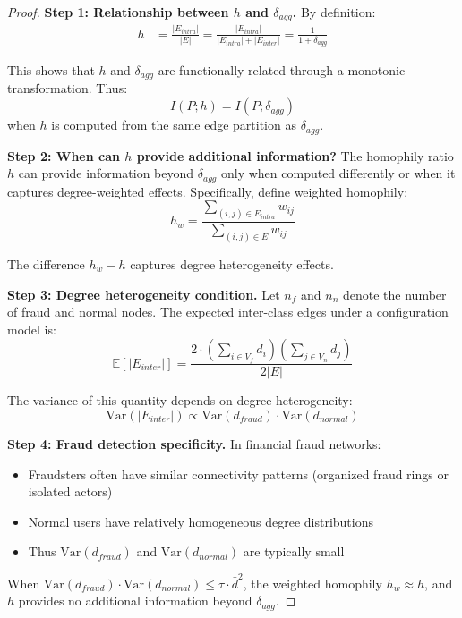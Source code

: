 \begin{proof}
\textbf{Step 1: Relationship between $h$ and $\delta_{agg}$.}
By definition:
\begin{align}
h &= \frac{|E_{intra}|}{|E|} = \frac{|E_{intra}|}{|E_{intra}| + |E_{inter}|} = \frac{1}{1 + \delta_{agg}}
\end{align}

This shows that $h$ and $\delta_{agg}$ are functionally related through a monotonic transformation. Thus:
\begin{equation}
I(P; h) = I(P; \delta_{agg})
\end{equation}
when $h$ is computed from the same edge partition as $\delta_{agg}$.

\textbf{Step 2: When can $h$ provide additional information?}
The homophily ratio $h$ can provide information beyond $\delta_{agg}$ only when computed differently or when it captures degree-weighted effects. Specifically, define weighted homophily:
\begin{equation}
h_w = \frac{\sum_{(i,j) \in E_{intra}} w_{ij}}{\sum_{(i,j) \in E} w_{ij}}
\end{equation}

The difference $h_w - h$ captures degree heterogeneity effects.

\textbf{Step 3: Degree heterogeneity condition.}
Let $n_f$ and $n_n$ denote the number of fraud and normal nodes. The expected inter-class edges under a configuration model is:
\begin{equation}
\mathbb{E}[|E_{inter}|] = \frac{2 \cdot (\sum_{i \in V_f} d_i)(\sum_{j \in V_n} d_j)}{2|E|}
\end{equation}

The variance of this quantity depends on degree heterogeneity:
\begin{equation}
\text{Var}(|E_{inter}|) \propto \text{Var}(d_{fraud}) \cdot \text{Var}(d_{normal})
\end{equation}

\textbf{Step 4: Fraud detection specificity.}
In financial fraud networks:
\begin{itemize}
    \item Fraudsters often have similar connectivity patterns (organized fraud rings or isolated actors)
    \item Normal users have relatively homogeneous degree distributions
    \item Thus $\text{Var}(d_{fraud})$ and $\text{Var}(d_{normal})$ are typically small
\end{itemize}

When $\text{Var}(d_{fraud}) \cdot \text{Var}(d_{normal}) \leq \tau \cdot \bar{d}^2$, the weighted homophily $h_w \approx h$, and $h$ provides no additional information beyond $\delta_{agg}$.
\end{proof}

